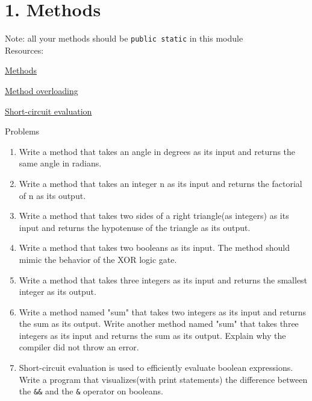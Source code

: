 \documentclass[12pt,letterpaper]{article}
\newcommand\hwnumber{1}
\begin{document}
\section*{\hwnumber. Methods}
Note: all your methods should be \lstinline{public static} in this module \\
Resources:
\begin{description}
    \item \href{https://www.geeksforgeeks.org/methods-in-java}{Methods}
    \item \href{https://www.geeksforgeeks.org/overloading-in-java/}{Method overloading}
    \item \href{https://stackoverflow.com/questions/9344305/what-is-short-circuiting-and-how-is-it-used-when-programming-in-java}{Short-circuit evaluation}
\end{description}


Problems
\begin{enumerate}
\item
Write a method that takes an angle in degrees as its input and returns the same angle in radians.

\item
Write a method that takes an integer n as its input and returns the factorial of n as its output.

\item
Write a method that takes two sides of a right triangle(as integers) as its input and returns the hypotenuse of the triangle as its output.

\item
Write a method that takes two booleans as its input. The method should mimic the behavior of the XOR logic gate.

\item
Write a method that takes three integers as its input and returns the smallest integer as its output.

\item
Write a method named "sum" that takes two integers as its input and returns the sum as its output.
Write another method named "sum" that takes three integers as its input and returns the sum as its output.
Explain why the compiler did not throw an error.

\item
Short-circuit evaluation is used to efficiently evaluate boolean expressions.
Write a program that visualizes(with print statements) the difference between the \lstinline{&&} and the \lstinline{&} operator on booleans.

\end{enumerate}
\end{document}
